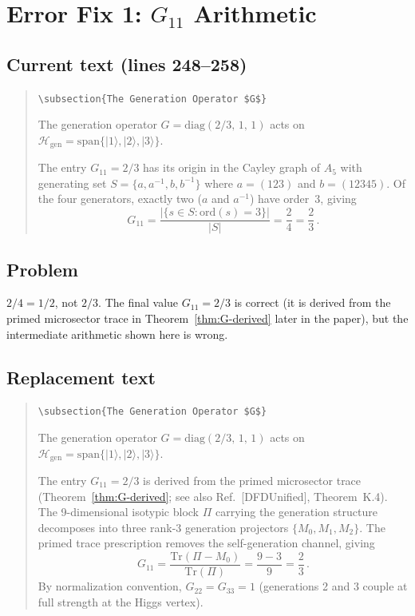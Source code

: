 \documentclass[11pt]{article}
\begin{document}
\section*{Error Fix 1: $G_{11}$ Arithmetic}

\subsection*{Current text (lines 248--258)}

\begin{quote}
\verb|\subsection{The Generation Operator $G$}|

The generation operator $G = \mathrm{diag}(2/3,\,1,\,1)$ acts on
$\mathcal{H}_{\text{gen}} = \mathrm{span}\{|1\rangle,|2\rangle,|3\rangle\}$.

The entry $G_{11} = 2/3$ has its origin in the Cayley graph of $A_5$ with
generating set $S = \{a,a^{-1},b,b^{-1}\}$ where $a=(123)$ and $b=(12345)$.
Of the four generators, exactly two ($a$ and $a^{-1}$) have order~3, giving
\[
G_{11} = \frac{|\{s\in S : \text{ord}(s) = 3\}|}{|S|} = \frac{2}{4} = \frac{2}{3}\,.
\]
\end{quote}

\subsection*{Problem}

$2/4 = 1/2$, not $2/3$. The final value $G_{11} = 2/3$ is correct (it is
derived from the primed microsector trace in Theorem~\ref{thm:G-derived}
later in the paper), but the intermediate arithmetic shown here is wrong.

\subsection*{Replacement text}

\begin{quote}
\verb|\subsection{The Generation Operator $G$}|

The generation operator $G = \mathrm{diag}(2/3,\,1,\,1)$ acts on
$\mathcal{H}_{\text{gen}} = \mathrm{span}\{|1\rangle,|2\rangle,|3\rangle\}$.

The entry $G_{11} = 2/3$ is derived from the primed microsector trace
(Theorem~\ref{thm:G-derived}; see also Ref.~[DFDUnified], Theorem~K.4).
The 9-dimensional isotypic block $\Pi$ carrying the generation structure
decomposes into three rank-3 generation projectors $\{M_0, M_1, M_2\}$.
The primed trace prescription removes the self-generation channel, giving
\begin{equation}
G_{11} = \frac{\mathrm{Tr}(\Pi - M_0)}{\mathrm{Tr}(\Pi)}
       = \frac{9 - 3}{9} = \frac{2}{3}\,.
\end{equation}
By normalization convention, $G_{22} = G_{33} = 1$ (generations 2 and 3
couple at full strength at the Higgs vertex).
\end{quote}
\end{document}
